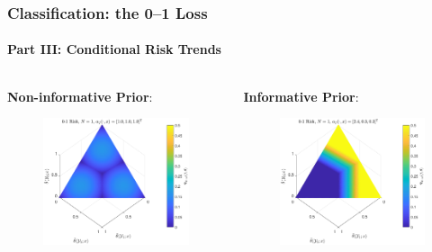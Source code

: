 \documentclass[aspectratio=169,usenames,dvipsnames]{beamer}
\begin{document}
\begin{frame}
\frametitle{Classification: the 0--1 Loss}
\framesubtitle{Part III: Conditional Risk Trends}

\begin{columns}[c]

\begin{column}{.5\linewidth}

\centering
\textbf{Non-informative Prior}:
%
\begin{figure}
\centering
\includegraphics[width=0.8\linewidth]{Risk_cond_ex_01_Dir_theta__uni_clim.pdf}
\label{fig:Risk_cond_ex_01_Dir_theta__uni}
\end{figure}

\end{column}

\begin{column}{.5\linewidth}

\centering
\textbf{Informative Prior}:
%
\begin{figure}
\centering
\includegraphics[width=0.8\linewidth]{Risk_cond_ex_01_Dir_theta__subj_clim.pdf}
\label{fig:Risk_cond_ex_01_Dir_theta__subj}
\end{figure}


\end{column}
\end{columns}
\end{frame}
\end{document}
